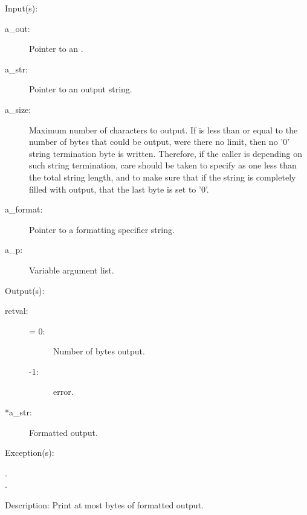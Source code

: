 \begin{capi}
	\begin{capilist}
	\item[Input(s): ]
		\begin{description}\item[]
		\item[a\_out: ]
			Pointer to an .
		\item[a\_str: ]
			Pointer to an output string.
		\item[a\_size: ]
			Maximum number of characters to output.  If
			 is less than or equal to the number of
			bytes that could be output, were there no limit, then no
			'{\bs}0' string termination byte is written.  Therefore,
			if the caller is depending on such string termination,
			care should be taken to specify  as one
			less than the total string length, and to make sure that
			if the string is completely filled with output, that the
			last byte is set to '{\bs}0'.
		\item[a\_format: ]
			Pointer to a formatting specifier string.
		\item[a\_p: ]
			Variable argument list.
		\end{description}
	\item[Output(s): ]
		\begin{description}\item[]
		\item[retval: ]
			\begin{description}\item[]
			\item[{\gt}= 0: ]
				Number of bytes output.
			\item[-1: ]
				 error.
			\end{description}
		\item[*a\_str: ]
			Formatted output.
		\end{description}
	\item[Exception(s): ]
		\begin{description}\item[]
		\item[.]
		\item[.]
		\end{description}
	\item[Description: ]
		Print at most  bytes of formatted output.

\end{capilist}
\end{capi}
